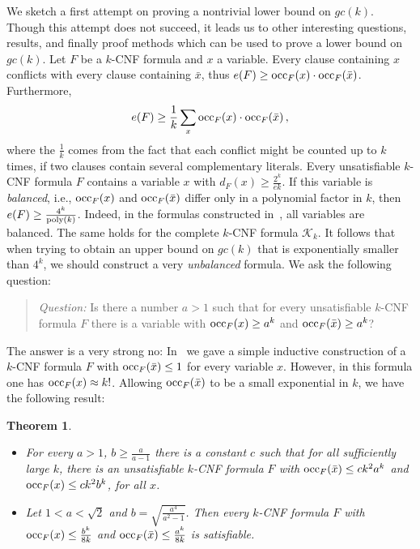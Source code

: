 \documentclass[a4paper, 11pt]{article}
\newtheorem{theorem}{Theorem}\newtheorem{proposition}[theorem]{Proposition}
\newcommand{\poly}{\ensuremath{\textnormal{poly}}}
\newcommand{\occ}{\ensuremath{{\rm{occ}}}}
\begin{document}
We sketch a first attempt on proving a nontrivial lower bound on
$gc(k)$. Though this attempt does not succeed, it leads us to other
interesting questions, results, and finally proof methods which can be
used to prove a lower bound on $gc(k)$.  Let $F$ be a $k$-CNF formula and
$x$ a variable. Every clause containing $x$ conflicts with every
clause containing $\bar{x}$, thus $e(F) \geq \occ_F(x) \cdot
\occ_F(\bar{x})$. Furthermore,
\begin{eqnarray}
  e(F) \geq \frac{1}{k} \sum_x \occ_F(x) \cdot \occ_F(\bar{x})\,,
\end{eqnarray}
where the $\frac{1}{k}$ comes from the fact that each conflict might
be counted up to $k$ times, if two clauses contain several
complementary literals.  Every unsatisfiable $k$-CNF formula $F$
contains a variable $x$ with $d_F(x) \geq \frac{2^k}{ek}$.  If this
variable is {\em balanced}, i.e., $\occ_F(x)$ and $\occ_F(\bar{x})$
differ only in a polynomial factor in $k$, then $e(F) \geq
\frac{4^k}{\poly(k)}$. Indeed, in the formulas constructed
in~\cite{Gebauer2009}, all variables are balanced. The same holds for
the complete $k$-CNF formula $\mathcal{K}_k$.  It follows that when
trying to obtain an upper bound on $gc(k)$ that is exponentially
smaller than $4^k$, we should construct a very {\em unbalanced}
formula.  We ask the following question:

\begin{quotation}
  {\em Question:} Is there a number $a>1$ such that for every
  unsatisfiable $k$-CNF formula $F$ there is a variable with
  $\occ_F(x) \geq a^k$ and $\occ_F(\bar{x}) \geq a^k$?
\end{quotation}

The answer is a very
strong no:
In~\cite{SZ2008} we gave a simple inductive construction of a $k$-CNF
formula $F$ with $\occ_F(\bar{x})\leq 1$ for every variable $x$.
However, in this formula one has $\occ_F(x) \approx k!$.
Allowing $\occ_F(\bar{x})$ to be a small exponential in $k$, we have
the following result:

\begin{theorem}
 
  \begin{itemize}
  \item[(i)] For every $a > 1$, $b \geq \frac{a}{a-1}$ there is a
    constant $c$ such that for all sufficiently large $k$, there is an
    unsatisfiable $k$-CNF formula $F$ with $\occ_F(\bar{x}) \leq
    ck^2a^k$ and $\occ_F(x) \leq ck^2b^k$, for all $x$.
  \item[(ii)] Let $1 < a < \sqrt{2}$ and $b =
    \sqrt{\frac{a^4}{a^2-1}}$. Then every $k$-CNF formula $F$ with
    $\occ_F(x) \leq \frac{b^k}{8k}$ and 
    $\occ_F(\bar{x}) \leq \frac{a^k}{8k}$ is
    satisfiable.
  \end{itemize}
  \label{tradeoff-exponential}
\end{theorem}
\end{document}

